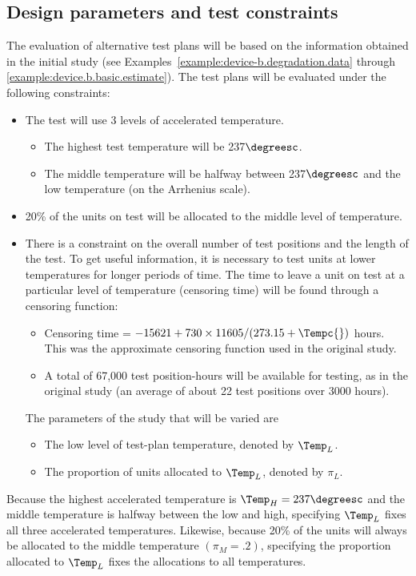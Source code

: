 \subsection{Design parameters and test constraints}

The evaluation of alternative test plans will be based on the
information obtained in the initial study (see
Examples~\ref{example:device-b.degradation.data} through
\ref{example:device.b.basic.estimate}).  The test plans will be
evaluated under the following constraints:
%
\begin{itemize} 
\item The test will use 
3 levels of accelerated temperature.
\begin{itemize}
\item The highest test temperature will be 237$\degreesc$.
\item The middle temperature will be halfway between 237$\degreesc$ and the
low temperature (on the Arrhenius scale).
\end{itemize}
\item 20\% of the units on test will be allocated to the middle
level of temperature.
\item 
There is a constraint on the overall number of test positions and
the length of the test. To get useful information, it is necessary
to test units at lower temperatures for longer periods of time. The
time to leave a unit on test at a particular level of temperature (censoring
time) will be found through a censoring function:
\begin{itemize}
\item Censoring time = $ - 15621 + 730 \times 11605/(273.15+\Tempc{})$ hours. 
This was the approximate censoring function used in the original
study.
\item 
A total of 
67,000 test position-hours will be available for testing, as in
the original study (an average of about 22 test positions over 3000 hours).
\end{itemize}
%
The parameters of the study that will be varied are
\begin{itemize}
\item The low level of test-plan temperature, denoted by $\Temp_{L}$.
\item The proportion of units allocated to $\Temp_{L}$,
denoted by $\pi_{L}$.
\end{itemize}
\end{itemize}
Because the highest accelerated temperature is $\Temp_{H}=
237\degreesc$ and the
middle temperature is halfway between the low and high, specifying
$\Temp_{L}$ fixes all three accelerated temperatures.  Likewise,
because 20\% of the units will always be allocated to the middle
temperature $(\pi_{M}=.2)$, 
specifying the proportion allocated to $\Temp_{L}$
fixes the allocations to all temperatures.
